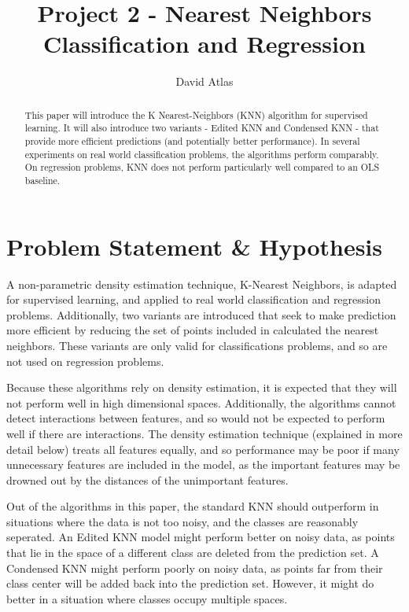 \documentclass{amsart}
\title{Project 2 - Nearest Neighbors Classification and Regression}
\author{David Atlas}
\begin{document}
    \begin{abstract}
        This paper will introduce the K Nearest-Neighbors (KNN) algorithm for supervised learning.
        It will also introduce two variants - Edited KNN and Condensed KNN - that provide
        more efficient predictions (and potentially better performance). In several experiments on
        real world classification problems, the algorithms perform comparably. On regression
        problems, KNN does not perform particularly well compared to an OLS baseline.
    \end{abstract}
    \maketitle
    \section{Problem Statement \& Hypothesis}
    A non-parametric density estimation technique, K-Nearest Neighbors,
    is adapted for supervised learning, and applied to
    real world classification and regression problems. Additionally,
    two variants are introduced that seek to make prediction more efficient
    by reducing the set of points included in calculated the nearest neighbors. These variants
    are only valid for classifications problems, and so are not used on regression problems.

    Because these algorithms rely on density estimation, it is expected that they will
    not perform well in high dimensional spaces. Additionally, the algorithms cannot detect
    interactions between features, and so would not be expected to perform well if there are
    interactions. The density estimation technique (explained in more detail below) treats
    all features equally, and so performance may be poor if many unnecessary features are
    included in the model, as the important features may be drowned out by the distances
    of the unimportant features.

    Out of the algorithms in this paper, the standard KNN should outperform in situations
    where the data is not too noisy, and the classes are reasonably seperated. An Edited KNN
    model might perform better on noisy data, as points that lie in the space of a different
    class are deleted from the prediction set. A Condensed KNN might perform poorly on noisy
    data, as points far from their class center will be added back into the prediction set.
    However, it might do better in a situation where classes occupy multiple spaces.
\end{document}
